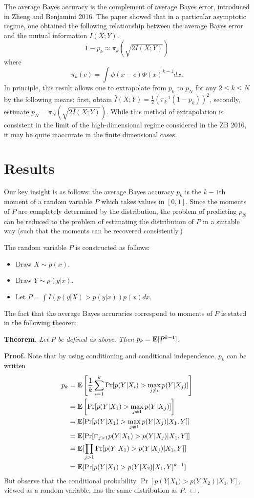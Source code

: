 \documentclass[12pt]{article}
\begin{document}
The average Bayes accuracy is the complement of average Bayes error,
 introduced in Zheng and Benjamini 2016.
The paper showed that in a particular asymptotic regime, one obtained the following relationship between
the average Bayes error and the mutual information $I(X;Y)$.
\[
1 - p_k \approx \pi_k(\sqrt{2I(X;Y)})
\]
where
\[
\pi_k(c) = \int \phi(x - c) \Phi(x)^{k-1} dx.
\]
In principle, this result allows one to extrapolate from $p_k$ to $p_N$ for any $2 \leq k \leq N$ by the following means: first, obtain $\hat{I}(X; Y) = \frac{1}{2}(\pi_k^{-1}(1-p_k))^2$,
secondly, estimate $p_N = \pi_N(\sqrt{2 \hat{I}(X; Y)})$.
While this method of extrapolation is consistent in the limit of the high-dimensional regime
considered in the ZB 2016, it may be quite inaccurate in the finite dimensional cases.

\section{Results}

Our key insight is as follows: the average Bayes accuracy $p_k$ is the $k-1$th moment of a random variable $P$ which takes values in $[0,1]$.
Since the moments of $P$ are completely determined by the distribution,
the problem of predicting $p_N$ can be reduced to the problem of estimating the distribution of $P$
in a suitable way (such that the moments can be recovered consistently.)

The random variable $P$ is constructed as follows:
\begin{itemize}
\item Draw $X \sim p(x)$.
\item Draw $Y \sim p(y|x)$.
\item Let $P = \int I(p(y|X) > p(y|x)) p(x) dx.$ 
\end{itemize}

The fact that the average Bayes accuracies correspond to moments of $P$ is stated in the following theorem.

\noindent\textbf{Theorem.} \emph{
Let $P$ be defined as above.  Then $p_k = \textbf{E}[P^{k-1}]$.
}

\noindent\textbf{Proof.}
Note that by using conditioning and conditional independence, $p_k$ can be written
\begin{align*}
p_k &= \textbf{E}\left[ \frac{1}{k}\sum_{i=1}^k  \Pr[p(Y|X_i) > \max_{j\neq i} p(Y|X_j)] \right]
\\&= \textbf{E}\left[ \Pr[p(Y|X_1) > \max_{j\neq 1} p(Y|X_j)] \right]
\\&= \textbf{E}[\Pr[p(Y|X_1) > \max_{j\neq 1} p(Y|X_j)|X_1, Y]]
\\&= \textbf{E}[\Pr[\cap_{j > 1} p(Y|X_1) > p(Y|X_j)|X_1, Y]]
\\&= \textbf{E}[\prod_{j > 1}\Pr[p(Y|X_1) > p(Y|X_j)|X_1, Y]]
\\&= \textbf{E}[\Pr[p(Y|X_1) > p(Y|X_2)|X_1, Y]^{k-1}]
\end{align*}
But observe that the conditional probability $\Pr[p(Y|X_1) > p(Y|X_2)|X_1, Y]$, viewed as a random variable,
has the same distribution as $P$. $\Box$.
\end{document}
